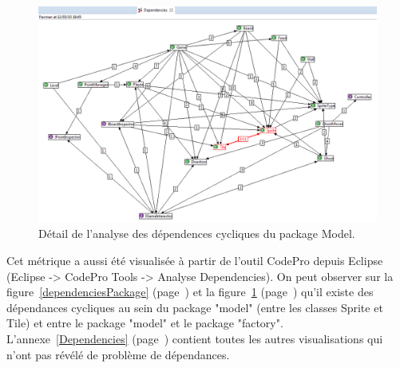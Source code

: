 \documentclass[12pt,a4paper,final]{article}
\newcommand{\annexe}[1]{annexe~\ref{#1} (page~\pageref{#1})}
\newcommand{\labelfigure}[1]{figure~\ref{#1} (page~\pageref{#1})}
\begin{document}
\begin{figure}[!h]
	\centering
	\includegraphics[width=\textwidth]{DependenciesModel.png}
	\caption{\label{dependenciesModel}Détail de l'analyse des dépendences cycliques du package Model.}
\end{figure}
Cet métrique a aussi été visualisée à partir de l'outil CodePro depuis Eclipse (Eclipse -> CodePro Tools -> Analyse Dependencies).
On peut observer sur la \labelfigure{dependenciesPackage} et la \labelfigure{dependenciesModel} qu'il existe des dépendances cycliques au sein du package "model" (entre les classes Sprite et Tile) et entre le package "model" et le package "factory".\\
L'\annexe{Dependencies} contient toutes les autres visualisations qui n'ont pas révélé de problème de dépendances.

\end{document}
